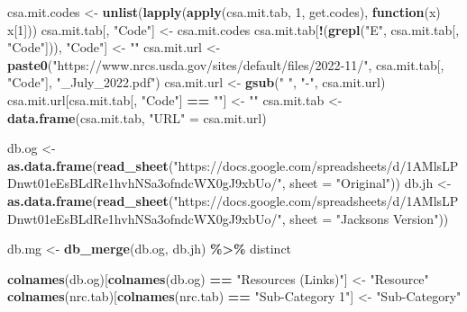 \documentclass[
]{article}
\newenvironment{Shaded}{\begin{snugshade}}{\end{snugshade}}
\newcommand{\AttributeTok}[1]{\textcolor[rgb]{0.13,0.29,0.53}{#1}}
\newcommand{\ControlFlowTok}[1]{\textcolor[rgb]{0.13,0.29,0.53}{\textbf{#1}}}
\newcommand{\DecValTok}[1]{\textcolor[rgb]{0.00,0.00,0.81}{#1}}
\newcommand{\FunctionTok}[1]{\textcolor[rgb]{0.13,0.29,0.53}{\textbf{#1}}}
\newcommand{\NormalTok}[1]{#1}
\newcommand{\OtherTok}[1]{\textcolor[rgb]{0.56,0.35,0.01}{#1}}
\newcommand{\SpecialCharTok}[1]{\textcolor[rgb]{0.81,0.36,0.00}{\textbf{#1}}}
\newcommand{\StringTok}[1]{\textcolor[rgb]{0.31,0.60,0.02}{#1}}
\begin{document}
\begin{Shaded}
\begin{Highlighting}[]
\NormalTok{csa.mit.codes }\OtherTok{\textless{}{-}} \FunctionTok{unlist}\NormalTok{(}\FunctionTok{lapply}\NormalTok{(}\FunctionTok{apply}\NormalTok{(csa.mit.tab, }\DecValTok{1}\NormalTok{, get.codes), }\ControlFlowTok{function}\NormalTok{(x) x[}\DecValTok{1}\NormalTok{]))}
\NormalTok{csa.mit.tab[, }\StringTok{"Code"}\NormalTok{] }\OtherTok{\textless{}{-}}\NormalTok{ csa.mit.codes}
\NormalTok{csa.mit.tab[}\SpecialCharTok{!}\NormalTok{(}\FunctionTok{grepl}\NormalTok{(}\StringTok{"E"}\NormalTok{, csa.mit.tab[, }\StringTok{"Code"}\NormalTok{])), }\StringTok{"Code"}\NormalTok{] }\OtherTok{\textless{}{-}} \StringTok{""}
\NormalTok{csa.mit.url }\OtherTok{\textless{}{-}} \FunctionTok{paste0}\NormalTok{(}\StringTok{"https://www.nrcs.usda.gov/sites/default/files/2022{-}11/"}\NormalTok{, }
\NormalTok{                      csa.mit.tab[, }\StringTok{"Code"}\NormalTok{],}
                      \StringTok{"\_July\_2022.pdf"}\NormalTok{)}
\NormalTok{csa.mit.url }\OtherTok{\textless{}{-}} \FunctionTok{gsub}\NormalTok{(}\StringTok{" "}\NormalTok{, }\StringTok{"{-}"}\NormalTok{, csa.mit.url)}
\NormalTok{csa.mit.url[csa.mit.tab[, }\StringTok{"Code"}\NormalTok{] }\SpecialCharTok{==} \StringTok{""}\NormalTok{] }\OtherTok{\textless{}{-}} \StringTok{""}
\NormalTok{csa.mit.tab }\OtherTok{\textless{}{-}} \FunctionTok{data.frame}\NormalTok{(csa.mit.tab, }\StringTok{"URL"} \OtherTok{=}\NormalTok{ csa.mit.url)}
\end{Highlighting}
\end{Shaded}

\begin{Shaded}
\begin{Highlighting}[]
\NormalTok{db.og }\OtherTok{\textless{}{-}} \FunctionTok{as.data.frame}\NormalTok{(}\FunctionTok{read\_sheet}\NormalTok{(}\StringTok{"https://docs.google.com/spreadsheets/d/1AMlsLPDnwt01eEsBLdRe1hvhNSa3ofndcWX0gJ9xbUo/"}\NormalTok{, }\AttributeTok{sheet =} \StringTok{"Original"}\NormalTok{))}
\NormalTok{db.jh }\OtherTok{\textless{}{-}} \FunctionTok{as.data.frame}\NormalTok{(}\FunctionTok{read\_sheet}\NormalTok{(}\StringTok{"https://docs.google.com/spreadsheets/d/1AMlsLPDnwt01eEsBLdRe1hvhNSa3ofndcWX0gJ9xbUo/"}\NormalTok{, }\AttributeTok{sheet =} \StringTok{"Jackson\textquotesingle{}s Version"}\NormalTok{))}

\NormalTok{db.mg }\OtherTok{\textless{}{-}} \FunctionTok{db\_merge}\NormalTok{(db.og, db.jh) }\SpecialCharTok{\%\textgreater{}\%} 
\NormalTok{    distinct}

\FunctionTok{colnames}\NormalTok{(db.og)[}\FunctionTok{colnames}\NormalTok{(db.og) }\SpecialCharTok{==} \StringTok{"Resources (Links)"}\NormalTok{] }\OtherTok{\textless{}{-}} \StringTok{"Resource"}
\FunctionTok{colnames}\NormalTok{(nrc.tab)[}\FunctionTok{colnames}\NormalTok{(nrc.tab) }\SpecialCharTok{==} \StringTok{"Sub{-}Category 1"}\NormalTok{] }\OtherTok{\textless{}{-}} \StringTok{"Sub{-}Category"}
\end{Highlighting}
\end{Shaded}
\end{document}
